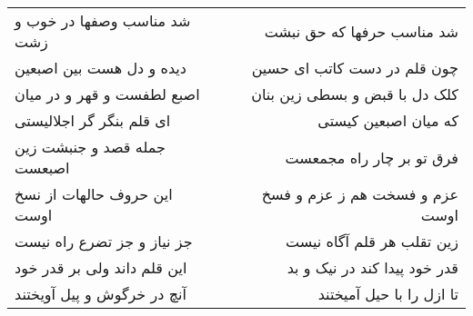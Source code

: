\begin{center}
\begin{longtable}{l p{0.5cm} r}
شد مناسب وصفها در خوب و زشت
&&
شد مناسب حرفها که حق نبشت
\\
دیده و دل هست بین اصبعین
&&
چون قلم در دست کاتب ای حسین
\\
اصبع لطفست و قهر و در میان
&&
کلک دل با قبض و بسطی زین بنان
\\
ای قلم بنگر گر اجلالیستی
&&
که میان اصبعین کیستی
\\
جمله قصد و جنبشت زین اصبعست
&&
فرق تو بر چار راه مجمعست
\\
این حروف حالهات از نسخ اوست
&&
عزم و فسخت هم ز عزم و فسخ اوست
\\
جز نیاز و جز تضرع راه نیست
&&
زین تقلب هر قلم آگاه نیست
\\
این قلم داند ولی بر قدر خود
&&
قدر خود پیدا کند در نیک و بد
\\
آنچ در خرگوش و پیل آویختند
&&
تا ازل را با حیل آمیختند
\\
\end{longtable}
\end{center}
